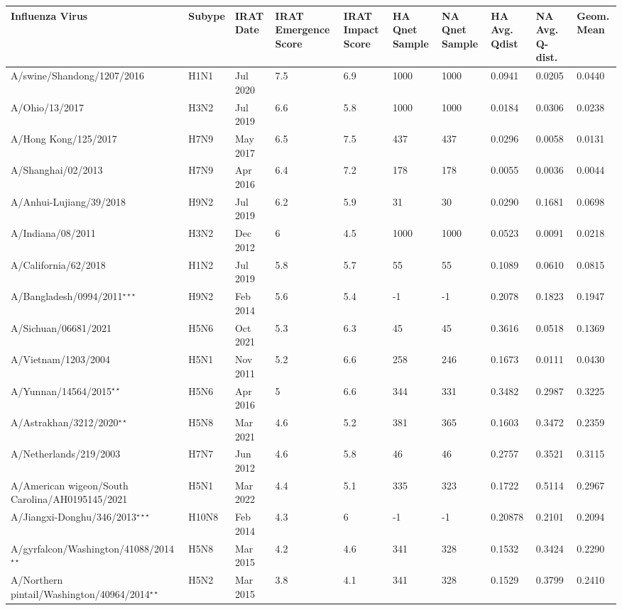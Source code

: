 \begin{tabular}{L{1.9in}|L{.35in}|L{.35in}|L{.35in}|L{.35in}|L{.35in}|L{.35in}|L{.35in}|L{.35in}|L{.35in}}\hline
Influenza Virus & Subype & IRAT Date &IRAT Emergence Score &IRAT Impact Score &HA Qnet Sample &NA Qnet Sample &HA Avg. Qdist &NA Avg. Q-dist. &Geom. Mean \\\hline
 A/swine/Shandong/1207/2016 &H1N1& Jul  2020 &7.5&6.9&1000&1000&0.0941&0.0205&0.0440\\\hline
 A/Ohio/13/2017 &H3N2& Jul  2019 &6.6&5.8&1000&1000&0.0184&0.0306&0.0238\\\hline
 A/Hong  Kong/125/2017 &H7N9& May  2017 &6.5&7.5&437&437&0.0296&0.0058&0.0131\\\hline
 A/Shanghai/02/2013 &H7N9& Apr  2016 &6.4&7.2&178&178&0.0055&0.0036&0.0044\\\hline
 A/Anhui-Lujiang/39/2018 &H9N2& Jul  2019 &6.2&5.9&31&30&0.0290&0.1681&0.0698\\\hline
 A/Indiana/08/2011 &H3N2& Dec  2012 &6&4.5&1000&1000&0.0523&0.0091&0.0218\\\hline
 A/California/62/2018 &H1N2& Jul  2019 &5.8&5.7&55&55&0.1089&0.0610&0.0815\\\hline
 A/Bangladesh/0994/2011$^{\star\star\star}$ &H9N2& Feb  2014 &5.6&5.4&-1&-1&0.2078&0.1823&0.1947\\\hline
 A/Sichuan/06681/2021 &H5N6& Oct  2021 &5.3&6.3&45&45&0.3616&0.0518&0.1369\\\hline
 A/Vietnam/1203/2004 &H5N1& Nov  2011 &5.2&6.6&258&246&0.1673&0.0111&0.0430\\\hline
 A/Yunnan/14564/2015$^{\star\star}$ &H5N6& Apr  2016 &5&6.6&344&331&0.3482&0.2987&0.3225\\\hline
 A/Astrakhan/3212/2020$^{\star\star}$ &H5N8& Mar  2021 &4.6&5.2&381&365&0.1603&0.3472&0.2359\\\hline
 A/Netherlands/219/2003 &H7N7& Jun  2012 &4.6&5.8&46&46&0.2757&0.3521&0.3115\\\hline
 A/American  wigeon/South  Carolina/AH0195145/2021 &H5N1& Mar  2022 &4.4&5.1&335&323&0.1722&0.5114&0.2967\\\hline
 A/Jiangxi-Donghu/346/2013$^{\star\star\star}$ &H10N8& Feb  2014 &4.3&6&-1&-1&0.20878&0.2101&0.2094\\\hline
 A/gyrfalcon/Washington/41088/2014$^{\star\star}$ &H5N8& Mar  2015 &4.2&4.6&341&328&0.1532&0.3424&0.2290\\\hline
 A/Northern  pintail/Washington/40964/2014$^{\star\star}$ &H5N2& Mar  2015 &3.8&4.1&341&328&0.1529&0.3799&0.2410\\\hline

\end{tabular}
